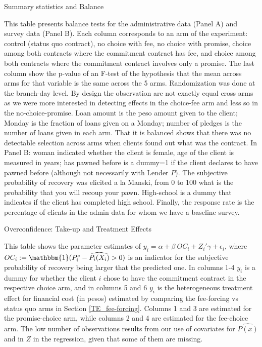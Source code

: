 \documentclass[oneside,11pt]{article}
\begin{document}
\begin{table}[H]
\caption{Summary statistics and Balance}
\label{SS}
\begin{center}
\scriptsize{}
\end{center}
 \scriptsize
This table presents balance tests for the administrative data (Panel A) and survey data (Panel B). Each column corresponds to an arm of the experiment: control (status quo contract), no choice with fee, no choice with promise, choice among both contracts where the commitment contract has fee, and choice among both contracts where the commitment contract involves only a promise. The last column show the p-value of an F-test of the hypothesis that the mean across arms for that variable is the same across the 5 arms. Randomization was done at the branch-day level. By design the observation are not exactly equal cross arms as we were more interested in detecting effects in the choice-fee arm and less so in the no-choice-promise. Loan amount is the peso amount given to the client; Monday is the fraction of loans given on a Monday; number of pledges is the number of loans given in each arm. That it is balanced shows that there was no detectable selection across arms when clients found out what was the contract. In Panel B: woman indicated whether the client is female, age of the client is measured in years; has pawned before is a dummy=1 if the client declares to have pawned before (although not necessarily with Lender $P$). The subjective probability of recovery was elicited a la Manski, from 0 to 100 what is the probability that you will recoup your pawn. High-school is a dummy that indicates if the client has completed high school. Finally, the response rate is the percentage of clients in the admin data for whom we have a baseline survey.
\end{table}


\newpage



\begin{table}[H]
\caption{Overconfidence: Take-up and Treatment Effects}
\label{oc_reg}
\begin{center}
\scriptsize{}
\end{center}
 \footnotesize This table shows the parameter estimates of $y_i = \alpha + \beta \: OC_i + Z_i'\gamma + \epsilon_i$, where $OC_i:=\mathbbm{1}(P^s_i-\widehat{P_i(X_i)}>0)$ is an indicator for the subjective probability of recovery being larger that the predicted one. In columns 1-4 $y_i$ is a dummy for whether the client $i$ chose to have the commitment contract in the respective choice arm, and in columns 5 and 6 $y_i$ is the heterogeneous treatment effect for financial cost (in pesos) estimated by comparing the fee-forcing vs status quo arms in Section \ref{TE_fee-forcing}. Columns 1 and 3 are estimated for the promise-choice arm, while columns 2 and 4 are estimated for the fee-choice arm. The low number of observations results from  our use of  covariates for $\widehat{P(x)}$ and in $Z$ in the regression, given that some of them are missing.
\end{table}
\end{document}

